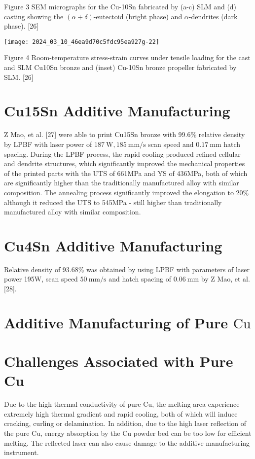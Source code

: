 \documentclass[10pt]{article}
\begin{document}
Figure 3 SEM micrographs for the Cu-10Sn fabricated by (a-c) SLM and (d) casting showing the $(\alpha+\delta)$-eutectoid (bright phase) and $\alpha$-dendrites (dark phase). [26]

\begin{center}
\texttt{[image: 2024\_03\_10\_46ea9d70c5fdc95ea927g-22]}
\end{center}

Figure 4 Room-temperature stress-strain curves under tensile loading for the cast and SLM Cu10Sn bronze and (inset) Cu-10Sn bronze propeller fabricated by SLM. [26]

\section*{Cu15Sn Additive Manufacturing}
Z Mao, et al. [27] were able to print Cu15Sn bronze with 99.6\% relative density by LPBF with laser power of $187 \mathrm{~W}, 185 \mathrm{~mm} / \mathrm{s}$ scan speed and $0.17 \mathrm{~mm}$ hatch spacing. During the LPBF process, the rapid cooling produced refined cellular and dendrite structures, which significantly improved the mechanical properties of the printed parts with the UTS of 661MPa and YS of 436MPa, both of which are significantly higher than the traditionally manufactured alloy with similar composition. The annealing process significantly improved the elongation to $20 \%$ although it reduced the UTS to 545MPa - still higher than traditionally manufactured alloy with similar composition.

\section*{Cu4Sn Additive Manufacturing}
Relative density of 93.68\% was obtained by using LPBF with parameters of laser power 195W, scan speed $50 \mathrm{~mm} / \mathrm{s}$ and hatch spacing of $0.06 \mathrm{~mm}$ by Z Mao, et al. [28].

\section*{Additive Manufacturing of Pure $\mathrm{Cu}$}
\section*{Challenges Associated with Pure Cu}
Due to the high thermal conductivity of pure $\mathrm{Cu}$, the melting area experience extremely high thermal gradient and rapid cooling, both of which will induce cracking, curling or delamination. In addition, due to the high laser reflection of the pure $\mathrm{Cu}$, energy absorption by the $\mathrm{Cu}$ powder bed can be too low for efficient melting. The reflected laser can also cause damage to the additive manufacturing instrument.
\end{document}
